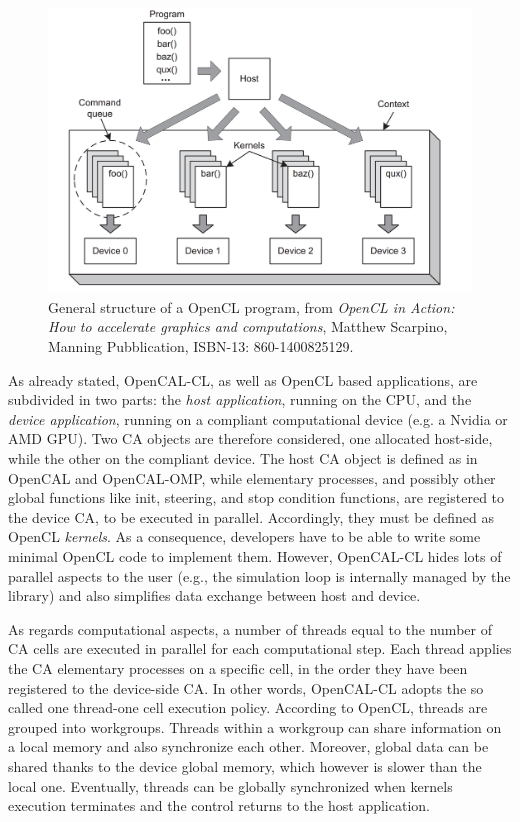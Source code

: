 \begin{figure}[tp]
  \begin{center}
    \includegraphics[width=12cm]{./images/OpenCAL-CL/kernelDistribution}
    \caption{General structure of a OpenCL program, from \emph{OpenCL
        in Action: How to accelerate graphics and computations},
      Matthew Scarpino, Manning Pubblication, ISBN-13:
      860-1400825129.}
    \label{fig:GeneralStructure}
  \end{center}
\end{figure}

As already stated, OpenCAL-CL, as well as OpenCL based applications,
are subdivided in two parts: the \emph{host application}, running on
the CPU, and the \emph{device application}, running on a compliant
computational device (e.g. a Nvidia or AMD GPU). Two CA objects are
therefore considered, one allocated host-side, while the other on the
compliant device. The host CA object is defined as in OpenCAL and
OpenCAL-OMP, while elementary processes, and possibly other global
functions like init, steering, and stop condition functions, are
registered to the device CA, to be executed in parallel. Accordingly,
they must be defined as OpenCL \emph{kernels}. As a consequence,
developers have to be able to write some minimal OpenCL code to
implement them. However, OpenCAL-CL hides lots of parallel aspects to
the user (e.g., the simulation loop is internally managed by the
library) and also simplifies data exchange between host and device.

As regards computational aspects, a number of threads equal to the
number of CA cells are executed in parallel for each computational
step. Each thread applies the CA elementary processes on a specific
cell, in the order they have been registered to the device-side CA. In
other words, OpenCAL-CL adopts the so called one thread-one cell
execution policy. According to OpenCL, threads are grouped into
workgroups. Threads within a workgroup can share information on a
local memory and also synchronize each other. Moreover, global data
can be shared thanks to the device global memory, which however is
slower than the local one. Eventually, threads can be globally
synchronized when kernels execution terminates and the control returns
to the host application.

